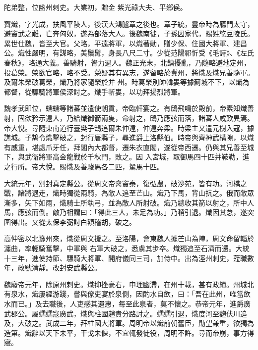 \begin{pinyinscope}
 陀弟整，位幽州刺史。大業初，贈金
 紫光祿大夫、平鄉侯。



 竇熾，字光成，扶風平陵人，後漢大鴻臚章之後也。章子統，靈帝時為鴈門太守，避竇武之難，亡奔匈奴，遂為部落大人。後魏南徙，子孫因家代，賜姓紇豆陵氏。累世仕魏，皆至大官。父略，平遠將軍，以熾著勛，贈少保、住國大將軍、建昌公。熾性嚴明，有謀略，美鬚髯，身長八尺二寸。少從范陽祁忻受《毛詩》、《左氏春秋》，略通大義。善騎射，膂力過人。魏正光末，北鎮擾亂，乃隨略避地定州，投葛榮。榮欲官略，略不受。榮疑其有異志，遂留略於冀州，將熾及熾兄善隨軍。及爾朱榮破葛榮，熾乃將家隨榮於并
 州。時葛榮別帥韓婁等據薊城不下，以熾為都督，從驃騎將軍侯深討之。熾手斬婁，以功拜揚烈將軍。



 魏孝武即位，蠕蠕等諸蕃並遣使朝貢，帝臨軒宴之。有鴟飛鳴於殿前，帝素知熾善射，固欲矜示遠人，乃給熾御箭兩隻，命射之，鴟乃應弦而落，諸蕃人咸歎異焉。帝大悅。尋隨東南道行臺樊子鵠追爾朱仲遠，仲遠奔梁。時梁主又遣元樹入寇，據譙城。子鵠令熾擊破之，封行唐縣子，尋進爵上洛縣伯。時帝與齊神武構隙，以熾有威重，堪處爪牙任，拜閣內大都督，遷朱衣直閣，遂從帝西遷。仍與其兄善至城下，與武衛將軍高金龍戰於千秋門，敗之。因
 入宮城，取御馬四十匹并鞍勒，進之行所。帝大悅。賜熾及善駿馬各二匹，駑馬十匹。



 大統元年，別封真定縣公。從周文帝禽竇泰，復弘農，破沙苑，皆有功。河橋之戰，諸將退走，熾時獨從兩騎，為敵人追至芒山。熾乃下馬，背山抗之。俄而敵眾漸多，矢下如雨，熾騎士所執弓，並為敵人所射破。熾乃總收其箭以射之，所中人馬，應弦而倒。敵乃相謂曰：「得此三人，未足為功。」乃稍引退。熾因其怠，遂突圍得出。又從太保李弼討白額稽胡，破之。



 高仲密以北豫州來，熾從周文援之。至洛陽，會東魏人據芒山為陣，周文命留輜於瀍曲，率輕騎奮擊，中軍與
 右軍大破之，悉虜其步卒。熾獨追至石濟而還。大統十三年，進使持節、驃騎大將軍、開府儀同三司，加侍中。出為涇州刺史，蒞職數年，政號清靜。改封安武縣公。



 魏廢帝元年，除原州刺史。熾抑挫豪右，申理幽滯，在州十載，甚有政績。州城北有泉水，熾屢經游踐，嘗與僚吏宴於泉側，因酌水自飲，曰：「吾在此州，唯當飲水而已。」及去職後，人吏感其遺惠，每至此泉者，莫不懷之。恭帝元年，進爵廣武郡公。屬蠕蠕寇廣武，熾與柱國趙貴分路討之。蠕蠕引退，熾度河至麴伏川追及，大破之。武成二年，拜柱國大將軍。周明帝以熾前朝舊臣，勛望兼重，欲獨為
 造第。熾辭以天下未平，干戈未偃，不宜輒發徒役，周明不許。尋而帝崩，事方得寢。




\end{pinyinscope}
